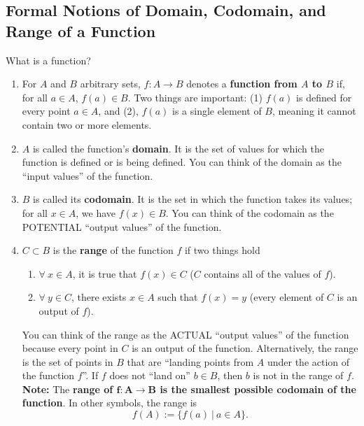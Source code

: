 \subsection{Formal Notions of Domain, Codomain, and Range of a Function}




\bigskip


\begin{tcolorbox}[colback=mylightblue, title = {\bf Defining Functions in a Careful Manner}, breakable]

\begin{definition} What is a function?     

\begin{enumerate}
\renewcommand{\labelenumi}{(\alph{enumi})}
\setlength{\itemsep}{.2cm}
\item For $A$ and $B$ arbitrary sets, $f:A \to B$ denotes a \textbf{function from $A$ to $B$} if, for all $a\in A$, $f(a) \in B$. Two things are important: (1) $f(a)$ is defined for every point $a\in A$, and (2), $f(a)$ is a single element of $B$, meaning it cannot contain two or more elements.
\item $A$ is called the function's \textbf{domain}. It is the set of values for which the function is defined or is being defined. You can think of the domain as the ``input values'' of the function.
\item $B$ is called its \textbf{codomain}. It is the set in which the function takes its values; for all $x\in A$, we have $f(x) \in B$. You can think of the codomain as the POTENTIAL ``output values'' of the function.
\item $C \subset B$ is the \textbf{range} of the function $f$ if two things hold
\begin{enumerate}
    \item $\forall ~x\in A$, it is true that $f(x) \in C$ ($C$ contains all of the values of $f$).
    \item $\forall ~y \in C$, there exists $x \in A$ such that $f(x)=y$ (every element of $C$ is an output of $f$).
\end{enumerate}
You can think of the range as the ACTUAL ``output values'' of the function because every point in $C$ is an output of the function. Alternatively, the range is the set of points in $B$ that are ``landing points from $A$ under the action of the function $f$''. If $f$ does not ``land on'' $b\in B$, then $b$ is not in the range of $f$. \\

\textbf{Note:} The \textbf{range of $\bm{f:A \to B}$ is the smallest possible codomain of the function}. In other symbols, the range is $$f(A):=\{f(a)~|~a \in A\}.$$

\end{enumerate}

\end{definition}


\end{tcolorbox}

